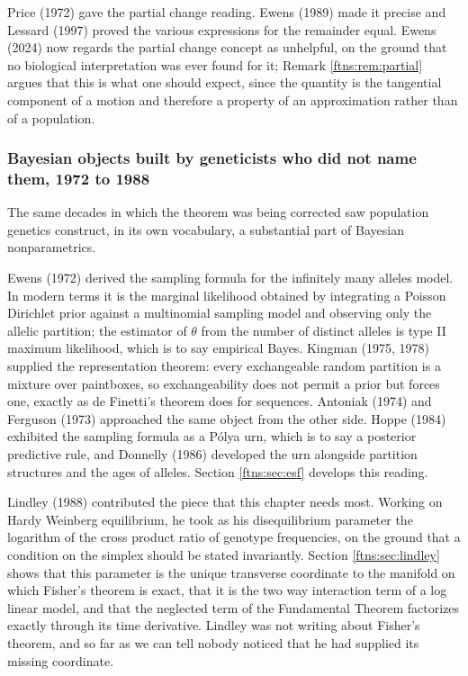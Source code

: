 Price (1972) gave the partial change reading. Ewens (1989) made it precise and Lessard (1997)
proved the various expressions for the remainder equal. Ewens (2024) now regards the
partial change concept as unhelpful, on the ground that no biological interpretation was ever
found for it; Remark \ref{ftns:rem:partial} argues that this is what one should expect, since the
quantity is the tangential component of a motion and therefore a property of an approximation
rather than of a population.

\subsubsection{Bayesian objects built by geneticists who did not name them, 1972 to 1988}

The same decades in which the theorem was being corrected saw population genetics construct, in
its own vocabulary, a substantial part of Bayesian nonparametrics.

Ewens (1972) derived the sampling formula for the infinitely many alleles model. In modern terms it
is the marginal likelihood obtained by integrating a Poisson Dirichlet prior against a
multinomial sampling model and observing only the allelic partition; the estimator of $\theta$ from
the number of distinct alleles is type II maximum likelihood, which is to say empirical Bayes.
Kingman (1975, 1978) supplied the representation theorem: every exchangeable random partition is a
mixture over paintboxes, so exchangeability does not permit a prior but forces one, exactly as de
Finetti's theorem does for sequences. Antoniak (1974) and Ferguson (1973) approached the same
object from the other side. Hoppe (1984) exhibited the sampling formula as a P\'olya urn, which
is to say a posterior predictive rule, and Donnelly (1986) developed the urn alongside partition structures and the ages of alleles. Section \ref{ftns:sec:esf} develops this reading.

Lindley (1988) contributed the piece that this chapter needs most. Working on Hardy Weinberg
equilibrium, he took as his disequilibrium parameter the logarithm of the cross product ratio of
genotype frequencies, on the ground that a condition on the simplex should be stated invariantly.
Section \ref{ftns:sec:lindley} shows that this parameter is the unique transverse coordinate to the
manifold on which Fisher's theorem is exact, that it is the two way interaction term of a
log linear model, and that the neglected term of the Fundamental Theorem factorizes exactly through
its time derivative. Lindley was not writing about Fisher's theorem, and so far as we can tell
nobody noticed that he had supplied its missing coordinate.


